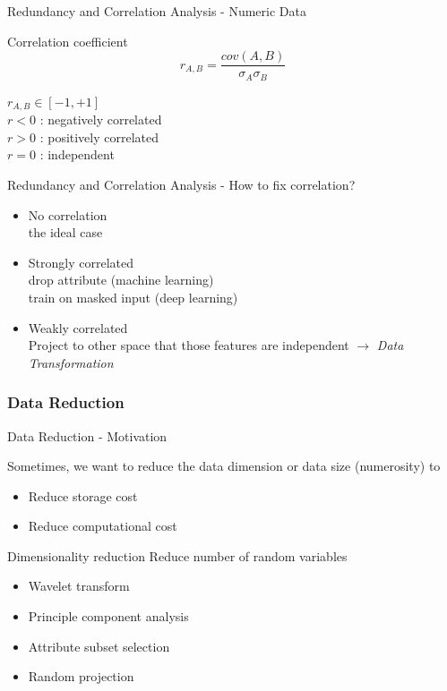 \begin{frame}{Redundancy and Correlation Analysis - Numeric Data}
\begin{exampleblock}{Correlation coefficient}
\begin{equation*}
    r_{A, B} = \frac{cov(A, B)}{\sigma_A \sigma_B}
\end{equation*}
\end{exampleblock}

$r_{A, B} \in [-1, +1]$ \\
$r < 0 $ : negatively correlated \\
$r > 0 $ : positively correlated \\
$r = 0$ : independent

\end{frame}

\begin{frame}{Redundancy and Correlation Analysis - How to fix correlation?}
\begin{itemize}
    \item No correlation \\
        the ideal case
    \item Strongly correlated \\
        drop attribute (machine learning) \\
        train on masked input (deep learning) \\
    \item Weakly correlated \\ 
        Project to other space that those features are independent $\to$ \emph{Data Transformation}
\end{itemize}
\end{frame}

\subsubsection{Data Reduction}
\begin{frame}{Data Reduction - Motivation}

Sometimes, we want to reduce the data dimension or data size (numerosity) to

\begin{itemize}
    \item Reduce storage cost
    \item Reduce computational cost
\end{itemize}
\end{frame}

\begin{frame}{Dimensionality reduction}
    Reduce number of random variables
    \begin{itemize}
        \item Wavelet transform
        \item Principle component analysis
        \item Attribute subset selection
        \item Random projection
    \end{itemize}
\end{frame}

